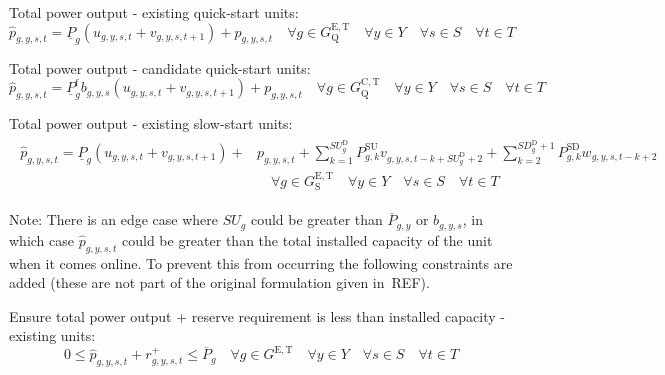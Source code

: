 \documentclass{article}
\newcommand{\sGeneratorsExistingThermal}{G^{\mathrm{E,T}}}
\newcommand{\sYears}{Y}
\newcommand{\sScenarios}{S}
\newcommand{\sIntervals}{T}
\newcommand{\sGeneratorsExistingThermalQuickStart}{G^{\mathrm{E,T}}_\mathrm{Q}}
\newcommand{\sGeneratorsCandidateThermalQuickStart}{G^{\mathrm{C,T}}_\mathrm{Q}}
\newcommand{\sGeneratorsExistingThermalSlowStart}{G^{\mathrm{E,T}}_\mathrm{S}}
\newcommand{\iGenerator}{g}
\newcommand{\iYear}{y}
\newcommand{\iScenario}{s}
\newcommand{\iInterval}{t}
\newcommand{\iIntervalAlias}{k}
\newcommand{\cPowerOutputMax}[1][\iGenerator,\iYear]{\overline{P}_{#1}}
\newcommand{\cPowerOutputMin}[1][\iGenerator]{\underline{P}_{#1}}
\newcommand{\cStartupDuration}[1][\iGenerator]{SU_{#1}^{\mathrm{D}}}
\newcommand{\cStartupTrajectory}[1][\iGenerator,\iIntervalAlias]{P^{\mathrm{SU}}_{#1}}
\newcommand{\cShutdownDuration}[1][\iGenerator]{SD_{#1}^{\mathrm{D}}}
\newcommand{\cShutdownTrajectory}[1][\iGenerator,\iIntervalAlias]{P^{\mathrm{SD}}_{#1}}
\newcommand{\cPowerOutputMinProportion}{\cPowerOutputMin^{\mathrm{f}}}
\newcommand{\cRampRateStartup}[1][\iGenerator]{SU_{#1}}
\newcommand{\vStartupIndicator}[1][\iGenerator,\iYear,\iScenario,\iInterval]{v_{#1}}
\newcommand{\vShutdownIndicator}[1][\iGenerator,\iYear,\iScenario,\iInterval]{w_{#1}}
\newcommand{\vReserveUp}[1][\iGenerator,\iYear,\iScenario,\iInterval]{r^{+}_{#1}}
\newcommand{\vOnIndicator}[1][\iGenerator,\iYear,\iScenario,\iInterval]{u_{#1}}
\newcommand{\vPower}[1][\iGenerator,\iYear,\iScenario,\iInterval]{p_{#1}}
\newcommand{\vPowerTotal}[1][\iGenerator,\iYear,\iScenario,\iInterval]{\hat{p}_{#1}}
\newcommand{\vInstalledCapacityTotalScenario}[1][\iGenerator,\iYear,\iScenario]{b_{#1}}
\begin{document}
Total power output - existing quick-start units:
\begin{equation}
\vPowerTotal = \cPowerOutputMin \left(\vOnIndicator + \vStartupIndicator[\iGenerator,\iYear,\iScenario,\iInterval+1]\right) + \vPower \quad \forall \iGenerator \in \sGeneratorsExistingThermalQuickStart \quad \forall \iYear \in \sYears \quad \forall \iScenario \in \sScenarios \quad \forall \iInterval \in \sIntervals
\end{equation}

Total power output - candidate quick-start units:
\begin{equation}
\vPowerTotal = \cPowerOutputMinProportion \vInstalledCapacityTotalScenario \left(\vOnIndicator + \vStartupIndicator[\iGenerator,\iYear,\iScenario,\iInterval+1]\right) + \vPower \quad \forall \iGenerator \in \sGeneratorsCandidateThermalQuickStart \quad \forall \iYear \in \sYears \quad \forall \iScenario \in \sScenarios \quad \forall \iInterval \in \sIntervals
\label{eqn: total power - quick start}
\end{equation}

Total power output - existing slow-start units:
\begin{align}
\begin{split}
\vPowerTotal =  \cPowerOutputMin \left(\vOnIndicator + \vStartupIndicator[\iGenerator,\iYear,\iScenario,\iInterval+1]\right) + & \vPower + \sum\limits_{\iIntervalAlias=1}^{\cStartupDuration} \cStartupTrajectory \vStartupIndicator[\iGenerator,\iYear,\iScenario,\iInterval-\iIntervalAlias+\cStartupDuration+2] + \sum\limits_{\iIntervalAlias=2}^{\cShutdownDuration + 1} \cShutdownTrajectory \vShutdownIndicator[\iGenerator,\iYear,\iScenario,\iInterval-\iIntervalAlias+2]\\
& \quad \forall \iGenerator \in \sGeneratorsExistingThermalSlowStart \quad \forall \iYear \in \sYears \quad \forall \iScenario \in \sScenarios \quad \forall \iInterval \in \sIntervals
\end{split}
\end{align}

Note: There is an edge case where $\cRampRateStartup$ could be greater than $\cPowerOutputMax$ or $\vInstalledCapacityTotalScenario$, in which case $\vPowerTotal$ could be greater than the total installed capacity of the unit when it comes online. To prevent this from occurring the following constraints are added (these are not part of the original formulation given in~REF).

Ensure total power output + reserve requirement is less than installed capacity - existing units:
\begin{equation}
	0 \leq \vPowerTotal + \vReserveUp \leq \cPowerOutputMax[\iGenerator] \quad \forall \iGenerator \in \sGeneratorsExistingThermal \quad \forall \iYear \in \sYears \quad \forall \iScenario \in \sScenarios \quad \forall \iInterval \in \sIntervals
\end{equation}
\end{document}
